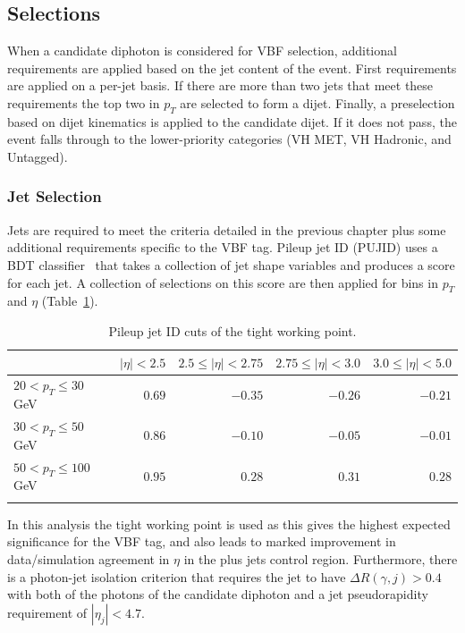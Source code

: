 \subsection{Selections}
When a candidate diphoton is considered for VBF selection, additional requirements are applied based on the jet content of the event. First requirements are applied on a per-jet basis. If there are more than two jets that meet these requirements the top two in $p_{T}$ are selected to form a dijet. Finally, a preselection based on dijet kinematics is applied to the candidate dijet. If it does not pass, the event falls through to the lower-priority categories (VH MET, VH Hadronic, and Untagged). 

\subsubsection{Jet Selection}
Jets are required to meet the criteria detailed in the previous chapter plus some additional requirements specific to the VBF tag.
Pileup jet ID (PUJID) uses a BDT classifier~\cite{CMS-PAS-JME-13-005} that takes a collection of jet shape variables and produces a score for each jet. A collection of selections on this score are then applied for bins in $p_{T}$ and $\eta$ (Table~\ref{tab:event_selection:tight_pujid}). 
\begin{table}[h!]
    \centering
    \renewcommand{\arraystretch}{1.3}
    \begin{tabular}{ l | r r r r }
        \thickhline
         & $|\eta| < 2.5$ & $2.5 \leq |\eta| < 2.75$ & $2.75 \leq |\eta| < 3.0$ & $3.0 \leq |\eta| < 5.0$ \\
        \hline
        $20 < p_{T} \leq 30$\,GeV  & $0.69$ & $-0.35$ & $-0.26$ & $-0.21$ \\
        $30 < p_{T} \leq 50$\,GeV  & $0.86$ & $-0.10$  & $-0.05$ & $-0.01$ \\
        $50 < p_{T} \leq 100$\,GeV & $0.95$ & $0.28$  & $0.31$  & $0.28$  \\
        \thickhline
\end{tabular}
    \caption{Pileup jet ID cuts of the tight working point.}
    \label{tab:event_selection:tight_pujid}
\end{table}
In this analysis the tight working point is used as this gives the highest expected significance for the VBF tag, and also leads to marked improvement in data/simulation agreement in $\eta$ in the \Zee plus jets control region.  
Furthermore, there is a photon-jet isolation criterion that requires the jet to have $\Delta{R}(\gamma,j) > 0.4$ with both of the photons of the candidate diphoton and a jet pseudorapidity requirement of  $|\eta_{j}| < 4.7$.







